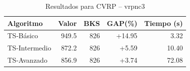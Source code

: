 \begin{table}[h]
\centering
\caption{Resultados para CVRP -- vrpnc3}
\label{tab:vrp_vrpnc3}
\begin{tabular}{lrrrr}
\hline
\textbf{Algoritmo} & \textbf{Valor} & \textbf{BKS} & \textbf{GAP(\%)} & \textbf{Tiempo (s)} \\
\hline
TS-Básico & 949.5 & 826 & +14.95 & 3.32 \\
TS-Intermedio & 872.2 & 826 & +5.59 & 10.40 \\
TS-Avanzado & 856.9 & 826 & +3.74 & 72.08 \\
\hline
\end{tabular}
\end{table}
